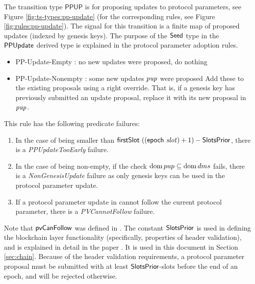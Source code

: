 The transition type $\mathsf{PPUP}$ is for proposing updates to protocol
parameters, see Figure \ref{fig:ts-types:pp-update} (for the corresponding rules,
see Figure \ref{fig:rules:pp-update}).
The signal for this transition is a finite map of proposed updates (indexed by
genesis keys). The purpose of the $\mathsf{Seed}$ type in the $\mathsf{PPUpdate}$ derived type is explained
in the protocol parameter adoption rules.

\begin{itemize}
  \item PP-Update-Empty : no new updates were proposed, do nothing
  \item PP-Update-Nonempty : some new updates $\mathit{pup}$ were proposed
  Add these to
  the existing proposals using a right override. That is, if a genesis key
  has previously submitted an update proposal, replace it with its new
  proposal in $\mathit{pup}$.
\end{itemize}

This rule has the following predicate failures:

\begin{enumerate}
\item In the case of  being smaller than
  $\mathsf{firstSlot}~((\mathsf{epoch}~\mathit{slot}) + 1) - \mathsf{SlotsPrior}$, there is
  a \emph{PPUpdateTooEarly} failure.
\item In the case of  being non-empty, if the check $\operatorname{dom} pup \subseteq
  \operatorname{dom} dms$ fails, there is a \emph{NonGenesisUpdate} failure as only genesis keys
  can be used in the protocol parameter update.
\item If a protocol parameter update in  cannot follow the current
  protocol parameter, there is a \emph{PVCannotFollow} failure.
\end{enumerate}

Note that $\mathsf{pvCanFollow}$
was defined in \cite{byron_ledger_spec}. The constant $\mathsf{SlotsPrior}$
is used in defining the blockchain layer functionality (specifically,
properties of header validation),
and is explained in detail in the paper \cite{byron_chain_spec}.
It is used in this document in
Section \ref{sec:chain}.
Because of the header validation requirements, a protocol parameter proposal
must be submitted with at least $\mathsf{SlotsPrior}$-slots before the end of an epoch,
and will be rejected otherwise.

